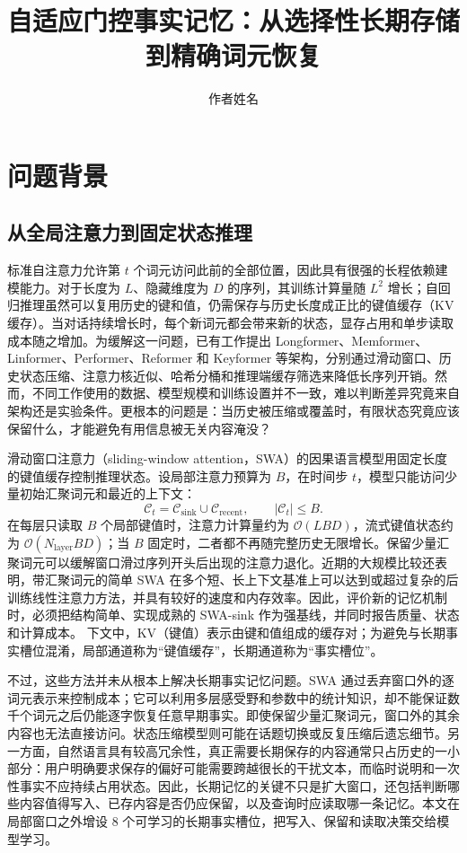 \documentclass[letterpaper]{article}
\title{自适应门控事实记忆：从选择性长期存储到精确词元恢复}
\author{作者姓名}
\begin{document}
\maketitle

\section{问题背景}

\subsection{从全局注意力到固定状态推理}

标准自注意力允许第 $t$ 个词元访问此前的全部位置，因此具有很强的长程依赖建模能力。对于长度为 $L$、隐藏维度为 $D$ 的序列，其训练计算量随 $L^2$ 增长；自回归推理虽然可以复用历史的键和值，仍需保存与历史长度成正比的键值缓存（KV 缓存）\cite{vaswani2017attention}。当对话持续增长时，每个新词元都会带来新的状态，显存占用和单步读取成本随之增加。为缓解这一问题，已有工作提出 Longformer、Memformer、Linformer、Performer、Reformer 和 Keyformer 等架构\cite{beltagy2020longformer,memformer2020,linformer2020,performer2021,reformer2020}，分别通过滑动窗口、历史状态压缩、注意力核近似、哈希分桶和推理端缓存筛选来降低长序列开销。然而，不同工作使用的数据、模型规模和训练设置并不一致，难以判断差异究竟来自架构还是实验条件。更根本的问题是：当历史被压缩或覆盖时，有限状态究竟应该保留什么，才能避免有用信息被无关内容淹没？

滑动窗口注意力（sliding-window attention，SWA）的因果语言模型用固定长度的键值缓存控制推理状态。设局部注意力预算为 $B$，在时间步 $t$，模型只能访问少量初始汇聚词元和最近的上下文：
\begin{equation}
\mathcal{C}_t=\mathcal{C}_{\mathrm{sink}}\cup
\mathcal{C}_{\mathrm{recent}},\qquad
|\mathcal{C}_t|\leq B.
\end{equation}
在每层只读取 $B$ 个局部键值时，注意力计算量约为 $\mathcal{O}(LBD)$，流式键值状态约为 $\mathcal{O}(N_{\mathrm{layer}}BD)$；当 $B$ 固定时，二者都不再随完整历史无限增长。保留少量汇聚词元可以缓解窗口滑过序列开头后出现的注意力退化\cite{xiao2024streamingllm}。近期的大规模比较还表明，带汇聚词元的简单 SWA 在多个短、长上下文基准上可以达到或超过复杂的后训练线性注意力方法，并具有较好的速度和内存效率\cite{jolicoeur2026sliding}。因此，评价新的记忆机制时，必须把结构简单、实现成熟的 SWA-sink 作为强基线，并同时报告质量、状态和计算成本。
下文中，KV（键值）表示由键和值组成的缓存对；为避免与长期事实槽位混淆，局部通道称为“键值缓存”，长期通道称为“事实槽位”。

不过，这些方法并未从根本上解决长期事实记忆问题。SWA 通过丢弃窗口外的逐词元表示来控制成本；它可以利用多层感受野和参数中的统计知识，却不能保证数千个词元之后仍能逐字恢复任意早期事实。即使保留少量汇聚词元，窗口外的其余内容也无法直接访问。状态压缩模型则可能在话题切换或反复压缩后遗忘细节。另一方面，自然语言具有较高冗余性，真正需要长期保存的内容通常只占历史的一小部分：用户明确要求保存的偏好可能需要跨越很长的干扰文本，而临时说明和一次性事实不应持续占用状态。因此，长期记忆的关键不只是扩大窗口，还包括判断哪些内容值得写入、已存内容是否仍应保留，以及查询时应读取哪一条记忆。本文在局部窗口之外增设 $8$ 个可学习的长期事实槽位，把写入、保留和读取决策交给模型学习。
\end{document}

